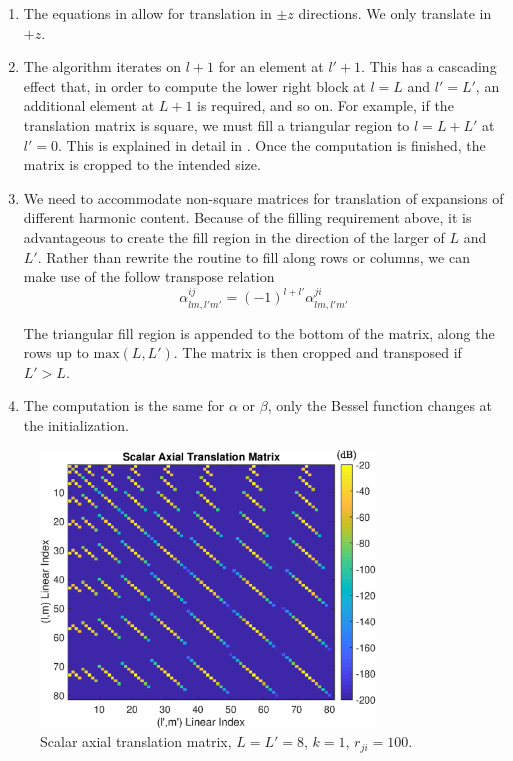 \begin{enumerate}
\item The equations in \cite{mackowski1991analysis} allow for translation in $\pm z$ directions.  We only translate in $+z$.  

\item The algorithm iterates on $l+1$ for an element at $l'+1$. This has a cascading effect that, in order to compute the lower right block at $l = L$ and $l' = L'$, an additional element at $L+1$ is required, and so on.  For example, if the translation matrix is square, we must fill a triangular region to $l = L + L'$ at $l'=0$.  This is explained in detail in \cite{chew1992recurrence}.  Once the computation is finished, the matrix is cropped to the intended size.  

\item We need to accommodate non-square matrices for translation of expansions of different harmonic content.  Because of the filling requirement above, it is advantageous to create the fill region in the direction of the larger of $L$ and $L'$.  Rather than rewrite the routine to fill along rows or columns, we can make use of the follow transpose relation 
\begin{equation}
\alpha^{ij}_{lm,l'm'} = (-1)^{l+l'}\alpha^{ji}_{lm,l'm'} \label{azflip}
\end{equation}

The triangular fill region is appended to the bottom of the matrix, along the rows up to $\textrm{max}(L,L')$. The matrix is then cropped and transposed if $L' > L$.  

\item The computation is the same for $\alpha$ or $\beta$, only the Bessel function changes at the initialization.  

\end{enumerate}


\begin{figure}[H] 
   \centering
   \includegraphics[width=3.5in]{Translation/Figures/trans1} 
   \caption{Scalar axial translation matrix, $L = L' = 8$, $k = 1$, $r_{ji} = 100$. }
   \label{fig4}
\end{figure}




